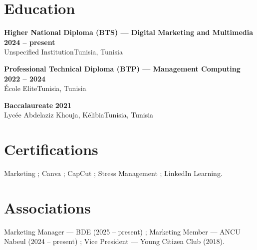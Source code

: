 \documentclass[a4paper,10pt]{article}
\newcommand{\cventry}[4]{%
  \textbf{#1} \hfill \textbf{#4}\\[1pt]
  #2{\ifx\relax#3\relax\else, #3\fi}\par\vspace{1.5pt}}
\begin{document}
\section{Education}
\cventry{Higher National Diploma (BTS) — Digital Marketing and Multimedia}{Unspecified Institution}{Tunisia}{2024 -- present}
\cventry{Professional Technical Diploma (BTP) — Management Computing}{École Elite}{Tunisia}{2022 -- 2024}
\cventry{Baccalaureate}{Lycée Abdelaziz Khouja, Kélibia}{Tunisia}{2021}
\section{Certifications}
Marketing ; Canva ; CapCut ; Stress Management ; LinkedIn Learning.
\section{Associations}
Marketing Manager — BDE (2025 -- present) ; Marketing Member — ANCU Nabeul (2024 -- present) ; Vice President — Young Citizen Club (2018).
\end{document}
